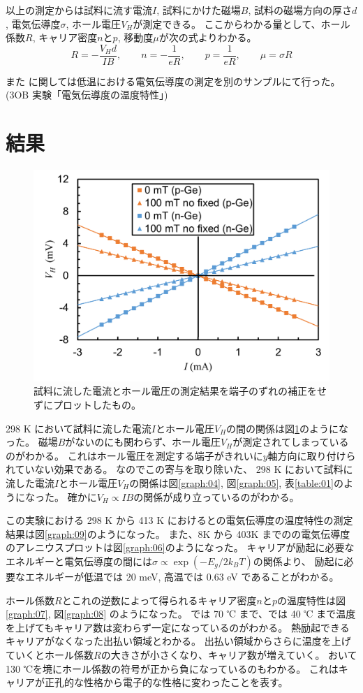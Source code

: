 \documentclass[11pt,dvipdfmx,a4paper]{jsarticle}
\numberwithin{equation}{section}
\begin{document}
以上の測定からは試料に流す電流\(I\), 試料にかけた磁場\(B\), 試料の磁場方向の厚さ\(d\),
電気伝導度\(\sigma\), ホール電圧\(V_H\)が測定できる。
ここからわかる量として、ホール係数\(R\), キャリア密度\(n\)と\(p\), 移動度\(\mu\)が次の式よりわかる。
\begin{equation}
	R = - \frac{V_H d}{IB}, \qquad
	n = - \frac{1}{eR}, \qquad p = \frac{1}{eR}, \qquad
	\mu = \sigma R
\end{equation}

また に関しては低温における電気伝導度の測定を別のサンプルにて行った。(3OB 実験「電気伝導度の温度特性」)


\section{結果}

\begin{figure}
	\centering
	\includegraphics[width=0.4\columnwidth]{graph/graph03.png}
	\caption{試料に流した電流とホール電圧の測定結果を端子のずれの補正をせずにプロットしたもの。}
	\label{graph:03}
\end{figure}
298 K において試料に流した電流\(I\)とホール電圧\(V_H\)の間の関係は図\ref{graph:03}のようになった。
磁場\(B\)がないのにも関わらず、ホール電圧\(V_H\)が測定されてしまっているのがわかる。
これはホール電圧を測定する端子がきれいに\(y\)軸方向に取り付けられていない効果である。
なのでこの寄与を取り除いた、
298 K において試料に流した電流\(I\)とホール電圧\(V_H\)の関係は図\ref{graph:04}, 図\ref{graph:05}, 表\ref{table:01}のようになった。
確かに\(V_H \propto IB\)の関係が成り立っているのがわかる。

この実験における 298 K から 413 K におけるとの電気伝導度の温度特性の測定結果は図\ref{graph:09}のようになった。
また、8K から 403K までのの電気伝導度のアレニウスプロットは図\ref{graph:06}のようになった。
キャリアが励起に必要なエネルギーと電気伝導度の間には\(\sigma\propto \exp(-E_g/2k_B T)\)の関係より、
励起に必要なエネルギーが低温では 20 meV, 高温では 0.63 eV であることがわかる。

ホール係数\(R\)とこれの逆数によって得られるキャリア密度\(n\)と\(p\)の温度特性は図\ref{graph:07}, 図\ref{graph:08} のようになった。
 では 70 ℃ まで、では 40 ℃ まで温度を上げてもキャリア数は変わらず一定になっているのがわかる。
熱励起できるキャリアがなくなった出払い領域とわかる。
出払い領域からさらに温度を上げていくとホール係数\(R\)の大きさが小さくなり、キャリア数が増えていく。
おいて 130 ℃を境にホール係数の符号が正から負になっているのもわかる。
これはキャリアが正孔的な性格から電子的な性格に変わったことを表す。
\end{document}
